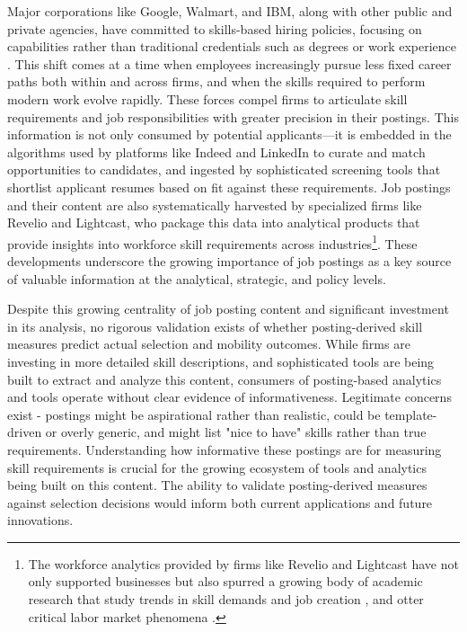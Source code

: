 \documentclass[12pt]{article}
\begin{document}
Major corporations like Google, Walmart, and IBM, along with other public and private agencies, have committed to skills-based hiring policies, focusing on capabilities rather than traditional credentials such as degrees or work experience \parencite{hbr2022skillsbased, mckinsey2020future, wef2020jobs}. This shift comes at a time when employees increasingly pursue less fixed career paths both within and across firms, and when the skills required to perform modern work evolve rapidly. These forces compel firms to articulate skill requirements and job responsibilities with greater precision in their postings. This information is not only consumed by potential applicants—it is embedded in the algorithms used by platforms like Indeed and LinkedIn to curate and match opportunities to candidates, and ingested by sophisticated screening tools that shortlist applicant resumes based on fit against these requirements. Job postings and their content are also systematically harvested by specialized firms like Revelio and Lightcast, who package this data into analytical products that provide insights into workforce skill requirements across industries\footnote{The workforce analytics provided by firms like Revelio and Lightcast have not only supported businesses but also spurred a growing body of academic research that study trends in skill demands and job creation \parencite{goldfarb2020artificial, azar2020concentration}, and otter critical labor market phenomena \parencite{hershbein2018recessions, forsythe2020labor, braxton2023technological}.}. These developments underscore the growing importance of job postings as a key source of valuable information at the analytical, strategic, and policy levels.


Despite this growing centrality of job posting content and significant investment in its analysis, no rigorous validation exists of whether posting-derived skill measures predict actual selection and mobility outcomes. While firms are investing in more detailed skill descriptions, and sophisticated tools are being built to extract and analyze this content, consumers of posting-based analytics and tools operate without clear evidence of informativeness. Legitimate concerns exist - postings might be aspirational rather than realistic, could be template-driven or overly generic, and might list "nice to have" skills rather than true requirements. Understanding how informative these postings are for measuring skill requirements is crucial for the growing ecosystem of tools and analytics being built on this content. The ability to validate posting-derived measures against selection decisions would inform both current applications and future innovations.
\end{document}
